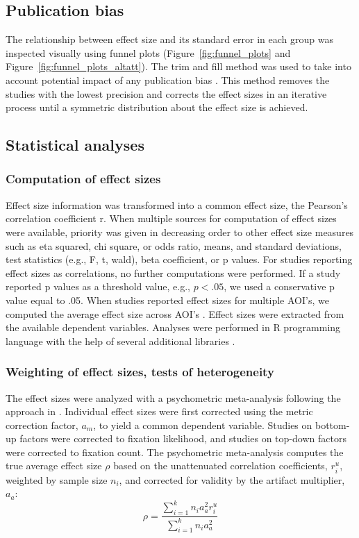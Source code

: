\documentclass[english,natbib,man,floatsintext]{apa6}
\begin{document}
\subsection{Publication bias}

The relationship between effect size and its standard error in each group was inspected visually using funnel plots (Figure~\ref{fig:funnel_plots} and Figure~\ref{fig:funnel_plots_altatt}). The trim and fill method was used to take into account potential impact of any publication bias \citep{duval2000trim}. This method removes the studies with the lowest precision and corrects the effect sizes in an iterative process until a symmetric distribution about the effect size is achieved.


\subsection{Statistical analyses}

\subsubsection{Computation of effect sizes}

Effect size information was transformed into a common effect size, the Pearson’s correlation coefficient r. When multiple sources for computation of effect sizes were available, priority was given in decreasing order to other effect size measures such as eta squared, chi square, or odds ratio, means, and standard deviations, test statistics (e.g., F, t, wald), beta coefficient, or p values. For studies reporting effect sizes as correlations, no further computations were performed. If a study reported p values as a threshold value, e.g., $p < .05$, we used a conservative p value equal to .05. When studies reported effect sizes for multiple AOI's, we computed the average effect size across AOI's \citep[for a similar approach, see][]{chita2016attention}. Effect sizes were extracted from the available dependent variables. Analyses were performed in R programming language with the help of several additional libraries \citep{R2020,del2012a,datatable,ggplot2,metafor}.


\subsubsection{Weighting of effect sizes, tests of heterogeneity}

The effect sizes were analyzed with a psychometric meta-analysis following the approach in \cite{hunter2004a}. Individual effect sizes were first corrected using the metric correction factor, $a_m$, to yield a common dependent variable. Studies on bottom-up factors were corrected to fixation likelihood, and studies on top-down factors were corrected to fixation count. The psychometric meta-analysis computes the true average effect size $\rho$ based on the unattenuated correlation coefficients, $r_i^u$, weighted by sample size $n_i$, and corrected for validity by the artifact multiplier, $a_a$: 
%
\begin{equation}
\label{eq:psychometric_rho}
\rho = \frac{\sum_{i=1}^k n_i a_a^2 r_i^u}{\sum_{i=1}^k n_i a_a^2}
\end{equation}
\end{document}
